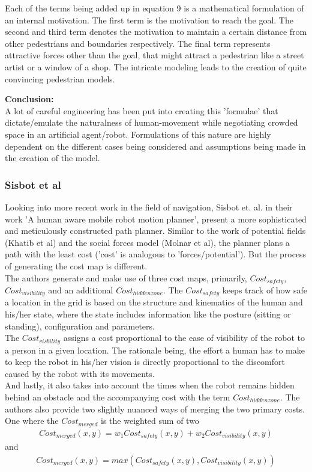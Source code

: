Each of the terms being added up in equation 9 is a mathematical formulation of an internal motivation.
The first term is the motivation to reach the goal.
The second and third term denotes the motivation to maintain a certain distance from other pedestrians and boundaries respectively.
The final term represents attractive forces other than the goal, that might attract a pedestrian like a street artist or a window of a shop.
The intricate modeling leads to the creation of quite convincing pedestrian models. 
\par
\textbf{Conclusion:}\\
A lot of careful engineering has been put into creating this 'formulae' that dictate/emulate the naturalness of human-movement while negotiating crowded space in an artificial agent/robot. 
Formulations of this nature are highly dependent on the different cases being considered and assumptions being made in the creation of the model. 
\subsubsection*{Sisbot et al}
Looking into more recent work in the field of navigation,
Sisbot et. al. in their work 'A human aware mobile robot motion planner', present a more sophisticated and meticulously constructed path planner. Similar to the work of potential fields (Khatib et al) and the social forces model (Molnar et al), the planner plans a path with the least cost ('cost' is analogous to 'forces/potential'). But the process of generating the cost map is different.\\
The authors generate and make use of three cost maps, primarily, $Cost_{safety}$, $Cost_{visibility}$ and an additional $Cost_{hidden zone}$.
The $Cost_{safety}$ keeps track of how safe a location in the grid is based on the structure and kinematics of the human and his/her state, where the state includes information like the posture (sitting or standing), configuration and parameters.\\
The $Cost_{visbility}$ assigns a cost proportional to the ease of visibility of the robot to a person in a given location. The rationale being, the effort a human has to make to keep the robot in his/her vision is directly proportional to the discomfort caused by the robot with its movements.\\
And lastly, it also takes into account the times when the robot remains hidden behind an obstacle and the accompanying cost with the term $Cost_{hidden zone}$. 
The authors also provide two slightly nuanced ways of merging the two primary costs. One where the $Cost_{merged}$ is the weighted sum of two
\begin{align}
Cost_{merged}(x,y) = w_{1}Cost_{safety}(x,y) + w_{2}Cost_{visibility}(x,y)
\end{align}
and 
\begin{align}
Cost_{merged}(x,y) = max(Cost_{safety}(x,y), Cost_{visibility}(x,y))
\end{align}


